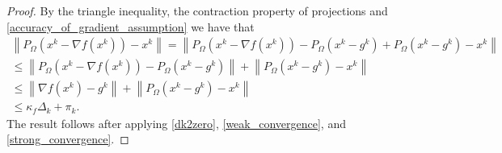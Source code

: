 \documentclass{article}
\theoremstyle{case}
\newcommand{\xk}{{x^k}}
\newcommand{\gk}{{g^k}}
\newcommand{\domain}{{\Omega}}
\newcommand{\dk}{{\Delta_k}}
\newcommand{\pik}{{\pi_k}}
\newcommand{\kappaf}{{\kappa_{f}}}
\newcommand{\gradfk}{{\nabla f \left(\xk\right)}}
\begin{document}
\begin{proof}
By the triangle inequality, the contraction property of projections and \cref{accuracy_of_gradient_assumption} we have that
\begin{align*}
\left\|P_{\domain}\left(\xk - \gradfk\right) - \xk\right\|
= \left\|P_{\domain}\left(\xk - \gradfk\right) - P_{\domain}\left(\xk - \gk\right) + P_{\domain}\left(\xk - \gk\right) - \xk\right\| \\
\le \left\|P_{\domain}\left(\xk - \gradfk\right) - P_{\domain}\left(\xk - \gk\right)\right\| + \left\|P_{\domain}\left(\xk - \gk\right) - \xk\right\| \\
\le \left\|\gradfk - \gk\right\| + \left\|P_{\domain}\left(\xk - \gk\right) - \xk\right\| \\
\le \kappaf \dk + \pik.
\end{align*}
The result follows after applying \cref{dk2zero}, \cref{weak_convergence}, and \cref{strong_convergence}.
\end{proof}
\end{document}
